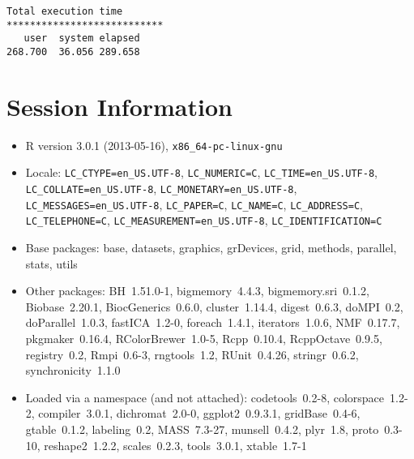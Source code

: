 \documentclass[10pt]{article}\usepackage{graphicx, color}
\begin{document}
\begin{verbatim}
Total execution time
***************************
   user  system elapsed 
268.700  36.056 289.658 

\end{verbatim}

\section*{Session Information}
\begin{itemize}\raggedright
  \item R version 3.0.1 (2013-05-16), \verb|x86_64-pc-linux-gnu|
  \item Locale: \verb|LC_CTYPE=en_US.UTF-8|, \verb|LC_NUMERIC=C|, \verb|LC_TIME=en_US.UTF-8|, \verb|LC_COLLATE=en_US.UTF-8|, \verb|LC_MONETARY=en_US.UTF-8|, \verb|LC_MESSAGES=en_US.UTF-8|, \verb|LC_PAPER=C|, \verb|LC_NAME=C|, \verb|LC_ADDRESS=C|, \verb|LC_TELEPHONE=C|, \verb|LC_MEASUREMENT=en_US.UTF-8|, \verb|LC_IDENTIFICATION=C|
  \item Base packages: base, datasets, graphics, grDevices, grid,
    methods, parallel, stats, utils
  \item Other packages: BH~1.51.0-1, bigmemory~4.4.3,
    bigmemory.sri~0.1.2, Biobase~2.20.1, BiocGenerics~0.6.0,
    cluster~1.14.4, digest~0.6.3, doMPI~0.2, doParallel~1.0.3,
    fastICA~1.2-0, foreach~1.4.1, iterators~1.0.6, NMF~0.17.7,
    pkgmaker~0.16.4, RColorBrewer~1.0-5, Rcpp~0.10.4, RcppOctave~0.9.5,
    registry~0.2, Rmpi~0.6-3, rngtools~1.2, RUnit~0.4.26,
    stringr~0.6.2, synchronicity~1.1.0
  \item Loaded via a namespace (and not attached): codetools~0.2-8,
    colorspace~1.2-2, compiler~3.0.1, dichromat~2.0-0, ggplot2~0.9.3.1,
    gridBase~0.4-6, gtable~0.1.2, labeling~0.2, MASS~7.3-27,
    munsell~0.4.2, plyr~1.8, proto~0.3-10, reshape2~1.2.2,
    scales~0.2.3, tools~3.0.1, xtable~1.7-1
\end{itemize}
\end{document}
